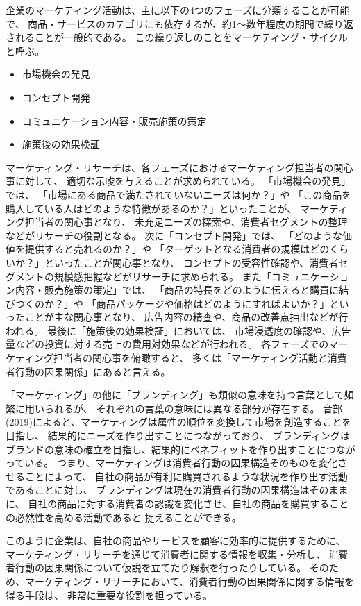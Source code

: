 企業のマーケティング活動は、主に以下の4つのフェーズに分類することが可能で、
商品・サービスのカテゴリにも依存するが、約1〜数年程度の期間で繰り返されることが一般的である。
この繰り返しのことをマーケティング・サイクルと呼ぶ。
\begin{itemize}
  \item 市場機会の発見
  \item コンセプト開発
  \item コミュニケーション内容・販売施策の策定
  \item 施策後の効果検証
\end{itemize}
マーケティング・リサーチは、各フェーズにおけるマーケティング担当者の関心事に対して、
適切な示唆を与えることが求められている。
「市場機会の発見」では、
「市場にある商品で満たされていないニーズは何か？」や
「この商品を購入している人はどのような特徴があるのか？」といったことが、
マーケティング担当者の関心事となり、
未充足ニーズの探索や、消費者セグメントの整理などがリサーチの役割となる。
次に「コンセプト開発」では、
「どのような価値を提供すると売れるのか？」や
「ターゲットとなる消費者の規模はどのくらいか？」といったことが関心事となり、
コンセプトの受容性確認や、消費者セグメントの規模感把握などがリサーチに求められる。
また「コミュニケーション内容・販売施策の策定」では、
「商品の特長をどのように伝えると購買に結びつくのか？」や
「商品パッケージや価格はどのようにすればよいか？」といったことが主な関心事となり、
広告内容の精査や、商品の改善点抽出などが行われる。
最後に「施策後の効果検証」においては、
市場浸透度の確認や、広告量などの投資に対する売上の費用対効果などが行われる。
各フェーズでのマーケティング担当者の関心事を俯瞰すると、
多くは「マーケティング活動と消費者行動の因果関係」にあると言える。

「マーケティング」の他に「ブランディング」も類似の意味を持つ言葉として頻繁に用いられるが、
それぞれの言葉の意味には異なる部分が存在する。
音部(2019)\cite{2019-eb}によると、マーケティングは属性の順位を変換して市場を創造することを目指し、
結果的にニーズを作り出すことにつながっており、
ブランディングはブランドの意味の確立を目指し、結果的にベネフィットを作り出すことにつながっている。
つまり、マーケティングは消費者行動の因果構造そのものを変化させることによって、
自社の商品が有利に購買されるような状況を作り出す活動であることに対し、
ブランディングは現在の消費者行動の因果構造はそのままに、
自社の商品に対する消費者の認識を変化させ、自社の商品を購買することの必然性を高める活動であると
捉えることができる。

このように企業は、自社の商品やサービスを顧客に効率的に提供するために、
マーケティング・リサーチを通じて消費者に関する情報を収集・分析し、
消費者行動の因果関係について仮説を立てたり解釈を行ったりしている。
そのため、マーケティング・リサーチにおいて、消費者行動の因果関係に関する情報を得る手段は、
非常に重要な役割を担っている。
